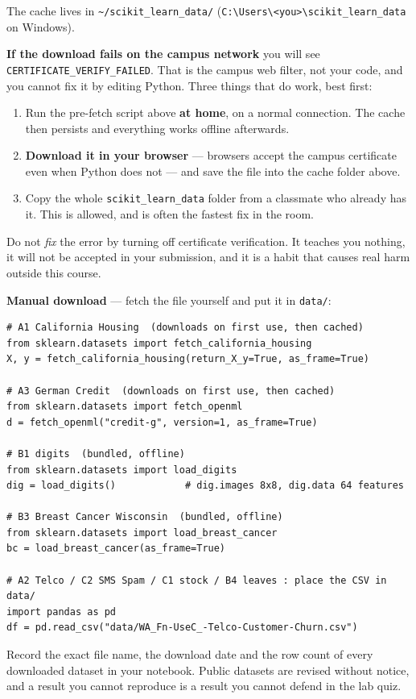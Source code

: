 \documentclass[11pt,a4paper]{article}
\begin{document}
The cache lives in \texttt{\textasciitilde/scikit\_learn\_data/} (\texttt{C:\textbackslash Users\textbackslash<you>\textbackslash scikit\_learn\_data} on Windows).

\textbf{If the download fails on the campus network} you will see \texttt{CERTIFICATE\_VERIFY\_FAILED}. That is the campus web filter, not your code, and you cannot fix it by editing Python. Three things that do work, best first:

\begin{enumerate}
  \item Run the pre-fetch script above \textbf{at home}, on a normal connection. The cache
        then persists and everything works offline afterwards.
  \item \textbf{Download it in your browser} --- browsers accept the campus certificate even
        when Python does not --- and save the file into the cache folder above.
  \item Copy the whole \texttt{scikit\_learn\_data} folder from a classmate who already has it.
        This is allowed, and is often the fastest fix in the room.
\end{enumerate}

\begin{warnbox}Do not \textit{fix} the error by turning off certificate verification. It teaches you nothing, it will not be accepted in your submission, and it is a habit that causes real harm outside this course.\end{warnbox}

\textbf{Manual download} --- fetch the file yourself and put it in \texttt{data/}:

\begin{lstlisting}
# A1 California Housing  (downloads on first use, then cached)
from sklearn.datasets import fetch_california_housing
X, y = fetch_california_housing(return_X_y=True, as_frame=True)

# A3 German Credit  (downloads on first use, then cached)
from sklearn.datasets import fetch_openml
d = fetch_openml("credit-g", version=1, as_frame=True)

# B1 digits  (bundled, offline)
from sklearn.datasets import load_digits
dig = load_digits()            # dig.images 8x8, dig.data 64 features

# B3 Breast Cancer Wisconsin  (bundled, offline)
from sklearn.datasets import load_breast_cancer
bc = load_breast_cancer(as_frame=True)

# A2 Telco / C2 SMS Spam / C1 stock / B4 leaves : place the CSV in data/
import pandas as pd
df = pd.read_csv("data/WA_Fn-UseC_-Telco-Customer-Churn.csv")
\end{lstlisting}

\begin{infobox}[Reproducibility]Record the exact file name, the download date and the row count of every downloaded dataset in your notebook. Public datasets are revised without notice, and a result you cannot reproduce is a result you cannot defend in the lab quiz.\end{infobox}

\notesources{\AMLLabSources}
\end{document}
